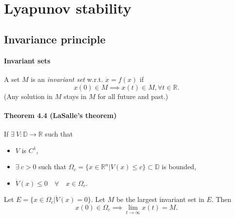 \section{Lyapunov stability}

\subsection{Invariance principle}

\paragraph{Invariant sets} A set $M$ is an \emph{invariant set} w.r.t. $\dot{x} = f(x)$ if
\begin{equation}
	x(0) \in M \implies x(t) \in M, \forall t \in \mathbb{R}.
\end{equation}
(Any solution in $M$ stays in $M$ for all future and past.)

\paragraph{Theorem 4.4 (LaSalle's theorem)}
If $\exists \: V : \mathbb{D} \rightarrow \mathbb{R}$ such that
\begin{itemize}
	\item $V$ is $C^1$,
	\item $\exists \: c > 0$ such that $\Omega_c = \{x \in \mathbb{R}^n | V(x) \leq c \} \subset \mathbb{D}$ is bounded,
	\item $\dot{V}(x) \leq 0 \quad \forall \quad x \in \Omega_c$.
\end{itemize}
Let $E = \{ x \in \Omega_c | \dot{V}(x) = 0 \}$. Let $M$ be the largest invariant set in $E$. Then
\begin{equation}
	x(0) \in \Omega_c \implies \lim_{t \to \infty} x(t) = M.
\end{equation}